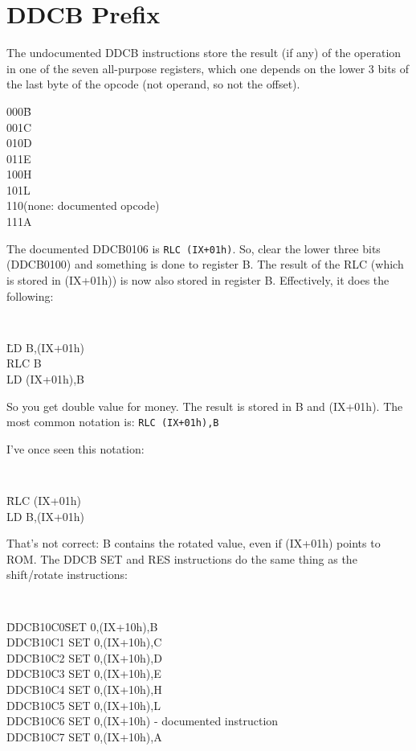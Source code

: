 \documentclass[oneside,a4paper]{book}
\begin{document}
\section{DDCB Prefix}
\label{prefix_cbdd}

The undocumented DDCB instructions store the result (if any) of the operation in one of the seven all-purpose registers, which one depends on the lower 3 bits of the last byte of the opcode (not operand, so not the offset).

\begin{tabbing}
	{\qquad}000\quad\=B\\
	{\qquad}001\>C\\
	{\qquad}010\>D\\
	{\qquad}011\>E\\
	{\qquad}100\>H\\
	{\qquad}101\>L\\
	{\qquad}110\>(none: documented opcode)\\
	{\qquad}111\>A
\end{tabbing}

The documented DDCB0106 is {\tt RLC (IX+01h)}. So, clear the lower three bits (DDCB0100) and something is done to register B. The result of the RLC (which is stored in (IX+01h)) is now also stored in register B. Effectively, it does the following:

{\tt
	\begin{tabbing}
		{\qquad}\=LD B,(IX+01h)\+\\
		RLC B\\
		LD (IX+01h),B
	\end{tabbing}
}

So you get double value for money. The result is stored in B and (IX+01h). The most common notation is: {\tt RLC (IX+01h),B}

I've once seen this notation:
 
{\tt
	\begin{tabbing}
		{\qquad}\=RLC (IX+01h)\+\\
		LD B,(IX+01h)
	\end{tabbing}
}

That's not correct: B contains the rotated value, even if (IX+01h) points to ROM. The DDCB SET and RES instructions do the same thing as the shift/rotate instructions:

{\tt 
	\begin{tabbing}
		{\qquad}\=DDCB10C0{\qquad}\=SET 0,(IX+10h),B\+\\
		DDCB10C1	\>SET 0,(IX+10h),C\\
		DDCB10C2	\>SET 0,(IX+10h),D\\
		DDCB10C3	\>SET 0,(IX+10h),E\\
		DDCB10C4	\>SET 0,(IX+10h),H\\
		DDCB10C5	\>SET 0,(IX+10h),L\\
		DDCB10C6	\>SET 0,(IX+10h) {\rm - documented instruction}\\
		DDCB10C7	\>SET 0,(IX+10h),A
	\end{tabbing}
}
\end{document}
